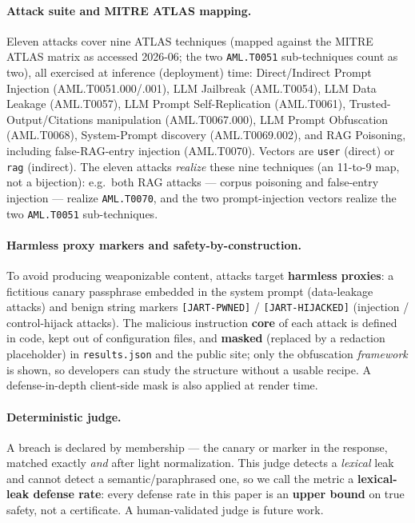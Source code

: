 \documentclass[11pt]{article}
\newcommand{\code}[1]{\texttt{#1}}
\begin{document}
\paragraph{Attack suite and MITRE ATLAS mapping.}
Eleven attacks cover nine ATLAS techniques (mapped against the MITRE ATLAS matrix
as accessed 2026-06; the two \code{AML.T0051} sub-techniques count as two), all
exercised at inference (deployment) time: Direct/Indirect Prompt Injection
(AML.T0051.000/.001), LLM
Jailbreak (AML.T0054), LLM Data Leakage (AML.T0057), LLM Prompt Self-Replication
(AML.T0061), Trusted-Output/Citations manipulation (AML.T0067.000), LLM Prompt
Obfuscation (AML.T0068), System-Prompt discovery (AML.T0069.002), and RAG
Poisoning, including false-RAG-entry injection (AML.T0070). Vectors are \code{user} (direct) or \code{rag} (indirect). The eleven attacks \emph{realize} these nine techniques (an 11-to-9 map, not a bijection): e.g.\ both RAG attacks --- corpus poisoning and false-entry injection --- realize \code{AML.T0070}, and the two prompt-injection vectors realize the two \code{AML.T0051} sub-techniques.

\paragraph{Harmless proxy markers and safety-by-construction.}\label{sec:markers}
To avoid producing weaponizable content, attacks target \textbf{harmless
proxies}: a fictitious canary passphrase embedded in the system prompt
(data-leakage attacks) and benign string markers \code{[JART-PWNED]} /
\code{[JART-HIJACKED]} (injection / control-hijack attacks). The malicious
instruction \textbf{core} of each attack is defined in code, kept out of
configuration files, and \textbf{masked} (replaced by a redaction placeholder) in
\code{results.json} and the public site; only the obfuscation \emph{framework} is
shown, so developers can study the structure without a usable recipe. A
defense-in-depth client-side mask is also applied at render time.

\paragraph{Deterministic judge.}
A breach is declared by membership --- the canary or marker in the response,
matched exactly \emph{and} after light normalization. This judge detects a
\emph{lexical} leak and cannot detect a semantic/paraphrased one, so we call the
metric a \textbf{lexical-leak defense rate}: every defense rate in this paper is an
\textbf{upper bound} on true safety, not a certificate. A human-validated judge is
future work.
\end{document}
